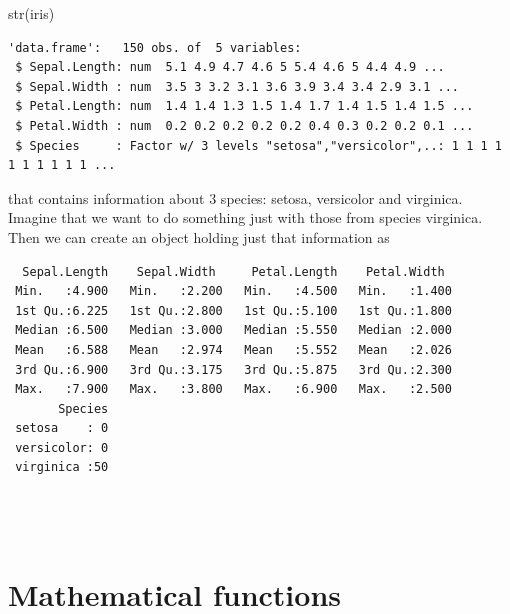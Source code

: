 \documentclass[
  letterpaper,
  DIV=11,
  numbers=noendperiod]{scrartcl}
\newenvironment{Shaded}{\begin{snugshade}}{\end{snugshade}}
\newcommand{\FloatTok}[1]{\textcolor[rgb]{0.68,0.00,0.00}{#1}}
\newcommand{\FunctionTok}[1]{\textcolor[rgb]{0.28,0.35,0.67}{#1}}
\newcommand{\NormalTok}[1]{\textcolor[rgb]{0.00,0.23,0.31}{#1}}
\newcommand{\OtherTok}[1]{\textcolor[rgb]{0.00,0.23,0.31}{#1}}
\newcommand{\SpecialCharTok}[1]{\textcolor[rgb]{0.37,0.37,0.37}{#1}}
\newcommand{\StringTok}[1]{\textcolor[rgb]{0.13,0.47,0.30}{#1}}
\begin{document}
\begin{Shaded}
\begin{Highlighting}[]
\FunctionTok{str}\NormalTok{(iris)}
\end{Highlighting}
\end{Shaded}

\begin{verbatim}
'data.frame':   150 obs. of  5 variables:
 $ Sepal.Length: num  5.1 4.9 4.7 4.6 5 5.4 4.6 5 4.4 4.9 ...
 $ Sepal.Width : num  3.5 3 3.2 3.1 3.6 3.9 3.4 3.4 2.9 3.1 ...
 $ Petal.Length: num  1.4 1.4 1.3 1.5 1.4 1.7 1.4 1.5 1.4 1.5 ...
 $ Petal.Width : num  0.2 0.2 0.2 0.2 0.2 0.4 0.3 0.2 0.2 0.1 ...
 $ Species     : Factor w/ 3 levels "setosa","versicolor",..: 1 1 1 1 1 1 1 1 1 1 ...
\end{verbatim}

that contains information about 3 species: setosa, versicolor and
virginica. Imagine that we want to do something just with those from
species virginica. Then we can create an object holding just that
information as

\begin{Shaded}
\end{Shaded}

\begin{verbatim}
  Sepal.Length    Sepal.Width     Petal.Length    Petal.Width   
 Min.   :4.900   Min.   :2.200   Min.   :4.500   Min.   :1.400  
 1st Qu.:6.225   1st Qu.:2.800   1st Qu.:5.100   1st Qu.:1.800  
 Median :6.500   Median :3.000   Median :5.550   Median :2.000  
 Mean   :6.588   Mean   :2.974   Mean   :5.552   Mean   :2.026  
 3rd Qu.:6.900   3rd Qu.:3.175   3rd Qu.:5.875   3rd Qu.:2.300  
 Max.   :7.900   Max.   :3.800   Max.   :6.900   Max.   :2.500  
       Species  
 setosa    : 0  
 versicolor: 0  
 virginica :50  
                
                
                
\end{verbatim}

\section{Mathematical functions}\label{mathematical-functions}
\end{document}
